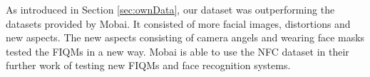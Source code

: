 As introduced in Section \ref{sec:ownData}, our dataset was outperforming the datasets provided by Mobai. It consisted of more facial images, distortions and new aspects. The new aspects consisting of camera angels and wearing face masks tested the FIQMs in a new way. Mobai is able to use the NFC dataset in their further work of testing new FIQMs and face recognition systems. 



